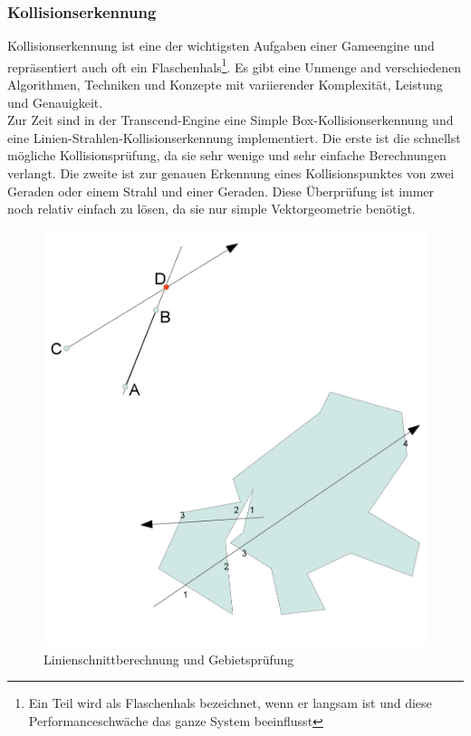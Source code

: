 \documentclass[12pt,a4paper,titlepage]{article}
\begin{document}
		\subsubsection{Kollisionserkennung}
			Kollisionserkennung ist eine der wichtigsten Aufgaben einer Gameengine und repräsentiert auch oft ein Flaschenhals\footnote{Ein Teil wird als Flaschenhals bezeichnet, wenn er langsam ist und diese Performanceschwäche das ganze System beeinflusst}. Es gibt eine Unmenge and verschiedenen Algorithmen, Techniken und Konzepte mit variierender Komplexität, Leistung und Genauigkeit.\\
			
			Zur Zeit sind in der Transcend-Engine eine Simple Box-Kollisionserkennung und eine Linien-Strahlen-Kollisionserkennung implementiert. Die erste ist die schnellst mögliche Kollisionsprüfung, da sie sehr wenige und sehr einfache Berechnungen verlangt. Die zweite ist zur genauen Erkennung eines Kollisionspunktes von zwei Geraden oder einem Strahl und einer Geraden. Diese Überprüfung ist immer noch relativ einfach zu lösen, da sie nur simple Vektorgeometrie benötigt.
			\begin{figure}[H]
  				\centering
				\includegraphics[keepaspectratio=true,scale=0.3]{collision.png}
  				\caption{Linienschnittberechnung und Gebietsprüfung}
			\end{figure}
\end{document}
